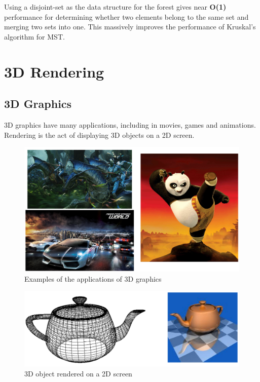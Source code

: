 \documentclass[
]{book}
\begin{document}
Using a disjoint-set as the data structure for the forest gives near \textbf{O(1)} performance for determining whether two elements belong to the same set and merging two sets into one. This massively improves the performance of Kruskal's algorithm for MST.

\hypertarget{threed}{%
\chapter{3D Rendering}\label{threed}}

\hypertarget{d-graphics}{%
\section{3D Graphics}\label{d-graphics}}

3D graphics have many applications, including in movies, games and animations. {Rendering} is the act of displaying {3D objects} on a {2D screen}.

\begin{figure}
\centering
\includegraphics{img/08-image01.png}
\caption{\label{fig:3d-app}Examples of the applications of 3D graphics}
\end{figure}

\begin{figure}
\centering
\includegraphics{img/08-image02.png}
\caption{\label{fig:3d-render}3D object rendered on a 2D screen}
\end{figure}
\end{document}
